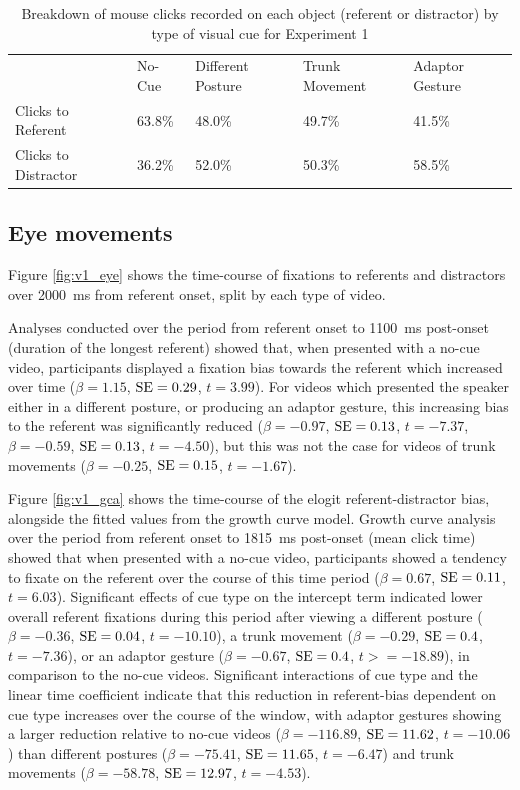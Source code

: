 \documentclass[a4paper,man,natbib]{apa6}
\newcommand{\resultsLM}[3]{$\beta = #1$, $\textnormal{SE} = #2$, $t #3$}
\begin{document}
\begin{table}
\caption{Breakdown of mouse clicks recorded on each object (referent or distractor) by type of visual cue for Experiment 1}
\label{table:v1_clicks}
\begin{tabularx}{\linewidth}{YYYYY}
\hline
& No-Cue & Different Posture & Trunk Movement & Adaptor Gesture \\
Clicks to Referent & 63.8\% & 48.0\% & 49.7\% & 41.5\%  \\ 
Clicks to Distractor & 36.2\% & 52.0\% & 50.3\% & 58.5\% \\
\hline
\end{tabularx}
\end{table}

\subsection{Eye movements}
Figure \ref{fig:v1_eye} shows the time-course of fixations to referents and distractors over 2000~ms from referent onset, split by each type of video.

Analyses conducted over the period from referent onset to 1100~ms post-onset (duration of the longest referent) showed that, when presented with a no-cue video, participants displayed a fixation bias towards the referent which increased over time (\resultsLM{1.15}{0.29}{=3.99}).
For videos which presented the speaker either in a different posture, or producing an adaptor gesture, this increasing bias to the referent was significantly reduced
(\resultsLM{-0.97}{0.13}{=-7.37}, \resultsLM{-0.59}{0.13}{=-4.50}), but this was not the case for videos of trunk movements (\resultsLM{-0.25}{0.15}{=-1.67}). 

Figure \ref{fig:v1_gca} shows the time-course of the elogit referent-distractor bias, alongside the fitted values from the growth curve model. 
Growth curve analysis over the period from referent onset to 1815~ms post-onset (mean click time) showed that when presented with a no-cue video, participants showed a tendency to fixate on the referent over the course of this time period (\resultsLM{0.67}{0.11}{=6.03}). 
Significant effects of cue type on the intercept term indicated lower overall referent fixations during this period after viewing a different posture (\resultsLM{-0.36}{0.04}{=-10.10}), a trunk movement (\resultsLM{-0.29}{0.4}{=-7.36}), or an adaptor gesture (\resultsLM{-0.67}{0.4}{>=-18.89}), in comparison to the no-cue videos.
Significant interactions of cue type and the linear time coefficient indicate that this reduction in referent-bias dependent on cue type increases over the course of the window, with adaptor gestures showing a larger reduction relative to no-cue videos (\resultsLM{-116.89}{11.62}{=-10.06}) than different postures (\resultsLM{-75.41}{11.65}{=-6.47}) and trunk movements (\resultsLM{-58.78}{12.97}{=-4.53}). 
\end{document}
